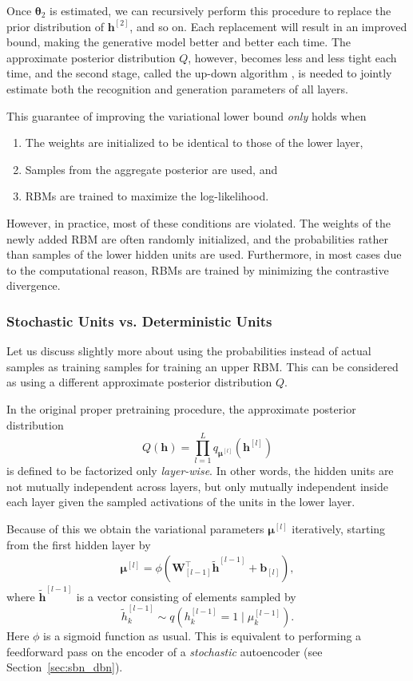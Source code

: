 \documentclass[dissertation,nocontribution,draft*]{aaltoseries}
\newcommand{\qlay}[1]{\left[#1\right]}
\newcommand{\vect}[1]{\mathbf{#1}}
\newcommand{\vects}[1]{\boldsymbol{#1}}
\newcommand{\matr}[1]{\mathbf{#1}}
\newcommand{\vb}[0]{\vect{b}}
\newcommand{\vh}[0]{\vect{h}}
\newcommand{\mW}[0]{\matr{W}}
\newcommand{\vmu}[0]{\vects{\mu}}
\newcommand{\TT}[0]{{\vects{\theta}}}
\begin{document}
Once $\TT_2$ is estimated, we can recursively perform this
procedure to replace the prior distribution of $\vh^{\qlay{2}}$,
and so on.  Each replacement will result in an improved
bound, making the generative model better and better each
time.  The approximate posterior distribution $Q$,
however, becomes less and less tight each time, and the
second stage, called the up-down algorithm
\citep{Hinton2006nc}, is needed to
jointly estimate both the recognition and generation
parameters of all layers.  

This guarantee of improving the variational lower bound
\textit{only} holds when
\begin{enumerate}
        \vspace{-5mm}
    \itemsep 0em
    \item The weights are initialized to be identical to
        those of the lower layer,
    \item Samples from the aggregate posterior are used, and
    \item RBMs are trained to maximize the log-likelihood.
\end{enumerate}

However, in practice, most of these conditions are violated. The weights
of the newly added RBM are often randomly initialized, and
the probabilities rather than samples of the lower hidden
units are used. Furthermore, in most cases due to the
computational reason, RBMs are trained by minimizing the
contrastive divergence. 

\subsubsection{Stochastic Units vs. Deterministic Units}
\label{sec:det_vs_sto}

Let us discuss slightly more about using the probabilities
instead of actual samples as training samples for training
an upper RBM. This can be considered as using a different
approximate posterior distribution $Q$.

In the original proper pretraining procedure, the
approximate posterior distribution
\[
Q(\vh) = \prod_{l=1}^L q_{\vmu^{\qlay{l}}}\left(
\vh^{\qlay{l}} \right)
\]
is defined to be factorized only \textit{layer-wise}. In
other words, the hidden units are not mutually independent
across layers, but only mutually independent inside each
layer given the sampled activations of the units in the
lower layer.

Because of this we obtain the variational parameters
$\vmu^{\qlay{l}}$ iteratively, starting from the first hidden
layer by
\begin{align}
    \label{eq:dbn_posterior}
    \vmu^{\qlay{l}} = \phi\left( \mW_{\qlay{l-1}}^\top
    \tilde{\vh}^{\qlay{l-1}} + \vb_{\qlay{l}} \right),
\end{align}
where $\tilde{\vh}^{\qlay{l-1}}$ is a vector consisting of
elements sampled by 
\[
\tilde{h}_k^{\qlay{l-1}} \sim q\left(h_k^{\qlay{l-1}} = 1 \mid
\mu_k^{\qlay{l-1}}\right).
\]
Here $\phi$ is a sigmoid function as usual. This is
equivalent to performing a feedforward pass on the encoder
of a \textit{stochastic} autoencoder (see
Section~\ref{sec:sbn_dbn}).
\end{document}
